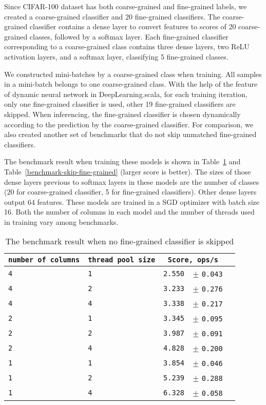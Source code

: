 Since CIFAR-100 dataset has both coarse-grained and fine-grained labels, we created a coarse-grained classifier and 20 fine-grained classifiers. The coarse-grained classifier contains a dense layer to convert features to scores of 20 coarse-grained classes, followed by a softmax layer. Each fine-grained classifier corresponding to a coarse-grained class contains three dense layers, two ReLU activation layers, and a softmax layer, classifying 5 fine-grained classes.

We constructed mini-batches by a coarse-grained class when training. All samples in a mini-batch belongs to one coarse-grained class. With the help of the feature of dynamic neural network in DeepLearning.scala, for each training iteration, only one fine-grained classifier is used, other 19 fine-grained classifiers are skipped. When inferencing, the fine-grained classifier is chosen dynamically according to the prediction by the coarse-grained classifier. For comparison, we also created another set of benchmarks that do not skip unmatched fine-grained classifiers.


The benchmark result when training these models is shown in Table~\ref{benchmark-dont-skip-fine-grained} and Table~\ref{benchmark-skip-fine-grained} (larger score is better). The sizes of those dense layers previous to softmax layers in these models are the number of classes (20 for coarse-grained classifier, 5 for fine-grained classifiers). Other dense layers output 64 features. These models are trained in a SGD optimizer with batch size 16. Both the number of columns in each model and the number of threads used in training vary among benchmarks.

\begin{table}[htbp]
  \begin{tabular}{l|l|l|rl}
  \texttt{number of columns} & \texttt{thread pool size} & \multicolumn{2}{c}{\texttt{Score, ops/s}} \\
  \hline
  \texttt{4} & \texttt{1} & \texttt{2.550} & \scriptsize $\pm$ \texttt{0.043}  \\
  \texttt{4} & \texttt{2} & \texttt{3.233} & \scriptsize $\pm$ \texttt{0.276}  \\
  \texttt{4} & \texttt{4} & \texttt{3.338} & \scriptsize $\pm$ \texttt{0.217}  \\
  \texttt{2} & \texttt{1} & \texttt{3.345} & \scriptsize $\pm$ \texttt{0.095}  \\
  \texttt{2} & \texttt{2} & \texttt{3.987} & \scriptsize $\pm$ \texttt{0.091}  \\
  \texttt{2} & \texttt{4} & \texttt{4.828} & \scriptsize $\pm$ \texttt{0.200}  \\
  \texttt{1} & \texttt{1} & \texttt{3.854} & \scriptsize $\pm$ \texttt{0.046}  \\
  \texttt{1} & \texttt{2} & \texttt{5.239} & \scriptsize $\pm$ \texttt{0.288}  \\
  \texttt{1} & \texttt{4} & \texttt{6.328} & \scriptsize $\pm$ \texttt{0.058}  \\
  \end{tabular}
  \caption{The benchmark result when no fine-grained classifier is skipped}
  \label{benchmark-dont-skip-fine-grained}
\end{table}

